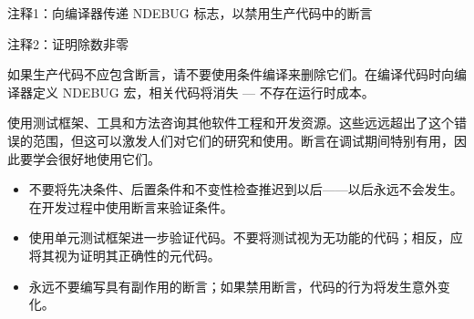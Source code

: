 {\footnotesize
注释1：向编译器传递 NDEBUG 标志，以禁用生产代码中的断言

注释2：证明除数非零
}

如果生产代码不应包含断言，请不要使用条件编译来删除它们。在编译代码时向编译器定义 NDEBUG 宏，相关代码将消失 — 不存在运行时成本。

使用测试框架、工具和方法咨询其他软件工程和开发资源。这些远远超出了这个错误的范围，但这可以激发人们对它们的研究和使用。断言在调试期间特别有用，因此要学会很好地使用它们。


\begin{itemize}
\item
不要将先决条件、后置条件和不变性检查推迟到以后——以后永远不会发生。在开发过程中使用断言来验证条件。

\item
使用单元测试框架进一步验证代码。不要将测试视为无功能的代码；相反，应将其视为证明其正确性的元代码。

\item
永远不要编写具有副作用的断言；如果禁用断言，代码的行为将发生意外变化。
\end{itemize}










